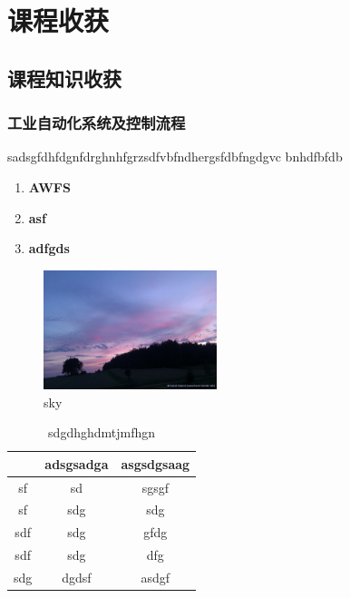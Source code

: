 \documentclass[12pt]{ctexart}
\date{}
\begin{document}
\tableofcontents
\clearpage

\section{课程收获}

\subsection{课程知识收获}

\subsubsection{工业自动化系统及控制流程}


\rightboxbegin
sadsgfdhfdgnfdrghnhfgrzsdfvbfndhergsfdbfngdgvc bnhdfbfdb
\rightboxend

\lipsum[1]

\lipsum[1]

\begin{enumerate}
  \item \textbf{AWFS}
 
  \item \textbf{asf}
 
  \item \textbf{adfgds}
\end{enumerate}

\begin{figure}[H]
\centering
\includegraphics[width=0.45\textwidth]{sky.jpg}
\caption{sky}
\end{figure}


\lipsum[1]

\begin{table}[h]
\centering
\begin{tabular}{ccc}
\arrayrulecolor{tabcolor} \toprule[1.4pt] 
&adsgsadga & asgsdgsaag \\
\hline
sf & sd & sgsgf \\
sf & sdg & sdg \\
sdf & sdg & gfdg \\
sdf & sdg & dfg \\
sdg & dgdsf & asdgf \\

\bottomrule[1.4pt]
\end{tabular}
\caption {sdgdhghdmtjmfhgn}
\label{tab:number}
\end{table}
\end{document}
